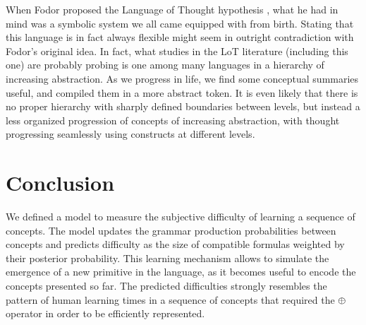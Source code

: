 When Fodor proposed the Language of Thought hypothesis \cite{fodor1975language}, what he had in mind was a symbolic system we all came equipped with from birth. Stating that this language is in fact always flexible might seem in outright contradiction with Fodor's original idea. In fact, what studies in the LoT literature (including this one) are probably probing is one among many languages in a hierarchy of increasing abstraction. As we progress in life, we find some conceptual summaries useful, and compiled them in a more abstract token. It is even likely that there is no proper hierarchy with sharply defined boundaries between levels, but instead a less organized progression of concepts of increasing abstraction, with thought progressing seamlessly using constructs at different levels. %


\section{Conclusion}

We defined a model to measure the subjective difficulty of learning a sequence of concepts. The model updates the grammar production probabilities between concepts and predicts difficulty as the size of compatible formulas weighted by their posterior probability. This learning mechanism allows to simulate the emergence of a new primitive in the language, as it becomes useful to encode the concepts presented so far. The predicted difficulties strongly resembles the pattern of human learning times in a sequence of concepts that required the $\oplus$ operator in order to be efficiently represented.
